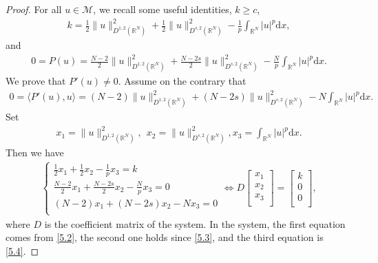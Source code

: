 \documentclass[12pt,a4paper,reqno]{amsart}
\numberwithin{equation}{section}
\begin{document}
\begin{proof}
For all $u\in \mathcal{M}$,
we recall some useful identities, $k\geqslant c$,
\begin{equation}\label{5.2}
\begin{aligned}
k=
\frac{1}{2}
\|u\|^{2}_{D^{1,2}(\mathbb{R}^{N})}
+
\frac{1}{2}
\|u\|^{2}_{D^{s,2}(\mathbb{R}^{N})}
-\frac{1}{p}\int_{\mathbb{R}^{N}}|u|^{p}\mathrm{d}x,
\end{aligned}
\end{equation}
and
\begin{equation}\label{5.3}
\begin{aligned}
0=P(u)=
\frac{N-2}{2}
\|u\|^{2}_{D^{1,2}(\mathbb{R}^{N})}
+
\frac{N-2s}{2}
\|u\|^{2}_{D^{s,2}(\mathbb{R}^{N})}
-\frac{N}{p}\int_{\mathbb{R}^{N}}|u|^{p}\mathrm{d}x.
\end{aligned}
\end{equation}
We prove that $P'(u)\not=0$.
Assume on the contrary that
\begin{equation}\label{5.4}
\begin{aligned}
0=\langle P'(u),u\rangle=
(N-2)
\|u\|^{2}_{D^{1,2}(\mathbb{R}^{N})}
+
(N-2s)
\|u\|^{2}_{D^{s,2}(\mathbb{R}^{N})}
-N\int_{\mathbb{R}^{N}}|u|^{p}\mathrm{d}x.
\end{aligned}
\end{equation}
Set
\begin{equation*}
\begin{aligned}
x_{1}=\|u\|^{2}_{D^{1,2}(\mathbb{R}^{N})},
~~x_{2}=\|u\|^{2}_{D^{s,2}(\mathbb{R}^{N})},
x_{3}=\int_{\mathbb{R}^{N}}|u|^{p}\mathrm{d}x.
\end{aligned}
\end{equation*}
Then we have
\begin{equation*}
\begin{aligned}
\begin{cases}
\frac{1}{2}x_{1}+\frac{1}{2}x_{2}-\frac{1}{p}x_{3}=k\\
\frac{N-2}{2}x_{1}+\frac{N-2s}{2}x_{2}-\frac{N}{p}x_{3}=0\\
(N-2)x_{1}+(N-2s)x_{2}-Nx_{3}=0\\
\end{cases}
\Leftrightarrow
D
\begin{bmatrix}
x_{1}\\
x_{2}\\
x_{3}\\
\end{bmatrix}
=
\begin{bmatrix}
k\\
0\\
0\\
\end{bmatrix},
\end{aligned}
\end{equation*}
where $D$ is the coefficient matrix of the system.
In the system, the first equation comes from \eqref{5.2},
the second one holds since \eqref{5.3},
and the third equation is \eqref{5.4}.



\end{proof}
\end{document}
